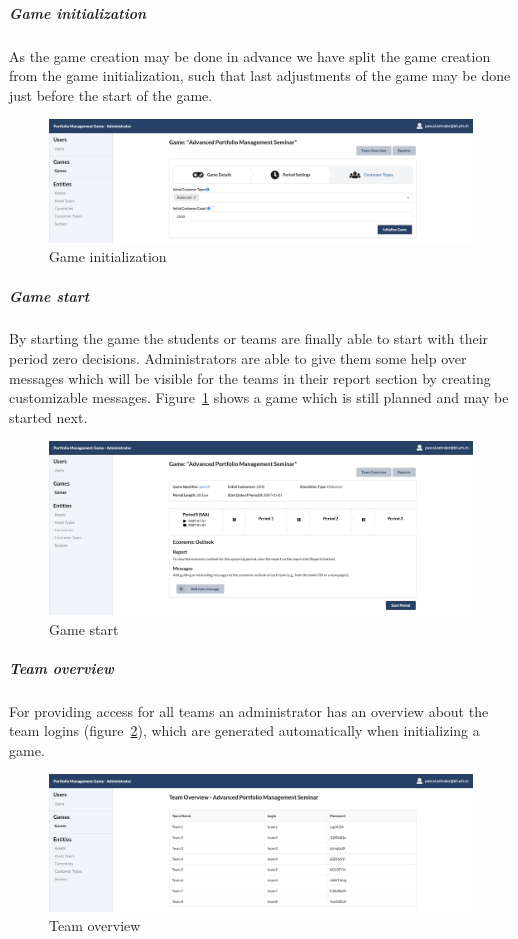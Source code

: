 \subparagraph{Game initialization}
As the game creation may be done in advance we have split the game creation from the game initialization, such that last adjustments of the game may be done just before the start of the game.
\begin{figure}[h!]
  \centering
  \includegraphics[scale=0.2]{img/application-overview/administrator/04_game_initialization.png}
  \caption{Game initialization}
\end{figure}

\subparagraph{Game start}
By starting the game the students or teams are finally able to start with their period zero decisions. Administrators are able to give them some help over messages which will be visible for the teams in their report section by creating customizable messages. Figure~\ref{fig:game_start} shows a game which is still planned and may be started next.
\begin{figure}[h!]
  \centering
  \includegraphics[scale=0.2]{img/application-overview/administrator/05_game_start.png}
  \caption{Game start}
  \label{fig:game_start}
\end{figure}


\subparagraph{Team overview}
\label{subparagraph:team_overview}
For providing access for all teams an administrator has an overview about the team logins (figure~\ref{fig:team_overview}), which are generated automatically when initializing a game.
\begin{figure}[h!]
  \centering
  \includegraphics[scale=0.2]{img/application-overview/administrator/06_team_login_overview.png}
  \caption{Team overview}
  \label{fig:team_overview}
\end{figure}

